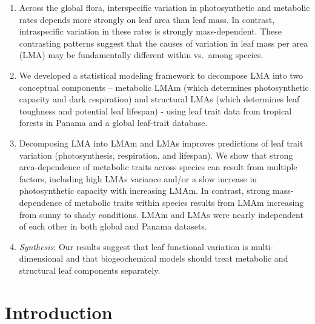 \documentclass[
  12pt,
  letterpaper,
  DIV=11,
  numbers=noendperiod]{scrartcl}
\begin{document}
\begin{enumerate}
\def\labelenumi{\arabic{enumi}.}
\item
  Across the global flora, interspecific variation in photosynthetic and
  metabolic rates depends more strongly on leaf area than leaf mass. In
  contrast, intraspecific variation in these rates is strongly
  mass-dependent. These contrasting patterns suggest that the causes of
  variation in leaf mass per area (LMA) may be fundamentally different
  within vs.~among species.
\item
  We developed a statistical modeling framework to decompose LMA into
  two conceptual components -- metabolic LMAm (which determines
  photosynthetic capacity and dark respiration) and structural LMAs
  (which determines leaf toughness and potential leaf lifespan) - using
  leaf trait data from tropical forests in Panama and a global
  leaf-trait database.
\item
  Decomposing LMA into LMAm and LMAs improves predictions of leaf trait
  variation (photosynthesis, respiration, and lifespan). We show that
  strong area-dependence of metabolic traits across species can result
  from multiple factors, including high LMAs variance and/or a slow
  increase in photosynthetic capacity with increasing LMAm. In contrast,
  strong mass-dependence of metabolic traits within species results from
  LMAm increasing from sunny to shady conditions. LMAm and LMAs were
  nearly independent of each other in both global and Panama datasets.
\item
  \emph{Synthesis}: Our results suggest that leaf functional variation
  is multi-dimensional and that biogeochemical models should treat
  metabolic and structural leaf components separately.
\end{enumerate}

\hypertarget{introduction}{%
\section{Introduction}\label{introduction}}
\end{document}
